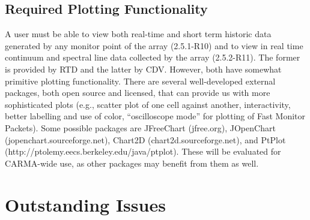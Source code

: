 \documentclass[preprint]{aastex}
\begin{document}
\subsection{Required Plotting Functionality}

A user must be able to view both real-time and short term historic data
generated by any monitor point of the array (2.5.1-R10) and to view in
real time continuum and spectral line data collected by the array (2.5.2-R11).
The former is provided by RTD and the latter by CDV.  However, both
have somewhat primitive plotting functionality.   There are several
well-developed external packages, both open source and licensed, that
can provide us with more sophisticated plots (e.g., scatter plot of
one cell against another, interactivity, 
better labelling and use of color, ``oscilloscope mode'' 
for plotting of Fast Monitor Packets).  Some possible packages are 
JFreeChart (jfree.org),
JOpenChart (jopenchart.sourceforge.net),
Chart2D (chart2d.sourceforge.net), and 
PtPlot (http://ptolemy.eecs.berkeley.edu/java/ptplot).
These will be evaluated for CARMA-wide use, as other packages may benefit
from them as well.

\section{Outstanding Issues}
\end{document}
